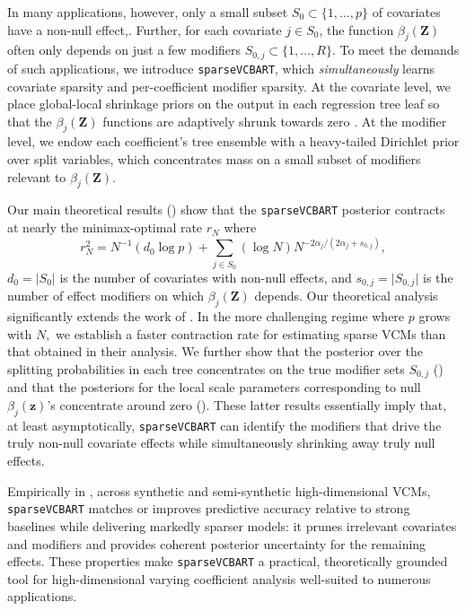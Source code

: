 \documentclass[11pt]{article}
\newcommand{\bz}{\bm{z}}
\newcommand{\bZ}{\bm{Z}}
\theoremstyle{plain}
\theoremstyle{definition}
\theoremstyle{plain}
\begin{document}
In many applications, however, only a small subset $S_0\subset\{1,\dots,p\}$ of covariates have a non-null effect,.
Further, for each covariate $j\in S_0$, the function $\beta_j(\bZ)$ often only depends on just a few modifiers $S_{0,j}\subset\{1,\dots,R\}$. 
To meet the demands of such applications, we introduce \texttt{sparseVCBART}, which \emph{simultaneously} learns covariate sparsity and per-coefficient modifier sparsity. 
At the covariate level, we place global-local shrinkage priors on the output in each regression tree leaf so that the $\beta_{j}(\bZ)$ functions are adaptively shrunk towards zero \citep{Carvalho2010,Polson2012,bhadra2016gl}. 
At the modifier level, we endow each coefficient’s tree ensemble with a heavy-tailed Dirichlet prior over split variables, which concentrates mass on a small subset of modifiers relevant to $\beta_j(\bZ)$.

Our main theoretical results () show that the \texttt{sparseVCBART} posterior contracts at nearly the minimax-optimal rate $r_{N}$ where
\[
r_N^2 =N^{-1}{(d_0\log p)}+\sum_{j\in S_0} (\log N)N^{-{2\alpha_j}/{(2\alpha_j+s_{0,j})}},
\]
$d_{0} = \lvert S_{0}\rvert$ is the number of covariates with non-null effects, and $s_{0,j} = \lvert S_{0,j}\rvert$ is the number of effect modifiers on which $\beta_{j}(\bZ)$ depends. 
Our theoretical analysis significantly extends the work of \citet{Deshpande2024}. In the more challenging regime where $p$ grows with $N,$ we establish a faster contraction rate for estimating sparse VCMs than that obtained in their analysis.
We further show that the posterior over the splitting probabilities in each tree concentrates on the true modifier sets $S_{0,j}$ () and that the posteriors for the local scale parameters corresponding to null $\beta_{j}(\bz)$'s concentrate around zero ().
These latter results essentially imply that, at least asymptotically, \texttt{sparseVCBART} can identify the modifiers that drive the truly non-null covariate effects while simultaneously shrinking away truly null effects.

Empirically in , across synthetic and semi-synthetic high-dimensional VCMs, \texttt{sparseVCBART} matches or improves predictive accuracy relative to strong baselines while delivering markedly sparser models: it prunes irrelevant covariates and modifiers and provides coherent posterior uncertainty for the remaining effects. 
These properties make \texttt{sparseVCBART} a practical, theoretically grounded tool for high-dimensional varying coefficient analysis well-suited to numerous applications.
\end{document}

